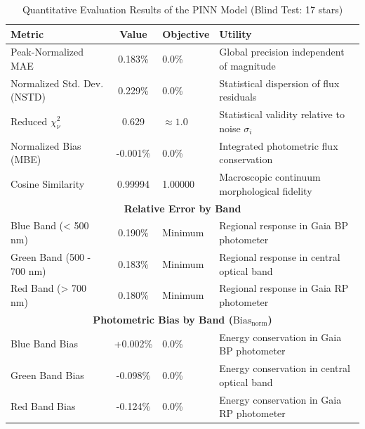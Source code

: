 
\begin{table}[htpb]
\centering
\caption{Quantitative Evaluation Results of the PINN Model (Blind Test: 17 stars)}
\label{tab:pinn_evaluation}
\begin{tabular}{lcll}
\hline
\textbf{Metric} & \textbf{Value} & \textbf{Objective} & \textbf{Utility} \\
\hline
Peak-Normalized MAE & 0.183\% & 0.0\% & Global precision independent of magnitude \\
Normalized Std. Dev. (NSTD) & 0.229\% & 0.0\% & Statistical dispersion of flux residuals \\
Reduced $\chi^2_\nu$ & 0.629 & $\approx 1.0$ & Statistical validity relative to noise $\sigma_i$ \\
Normalized Bias (MBE) & -0.001\% & 0.0\% & Integrated photometric flux conservation \\
Cosine Similarity & 0.99994 & 1.00000 & Macroscopic continuum morphological fidelity \\
\hline
\multicolumn{4}{c}{\textbf{Relative Error by Band}} \\
\hline
Blue Band (< 500 nm) & 0.190\% & Minimum & Regional response in Gaia BP photometer \\
Green Band (500 - 700 nm) & 0.183\% & Minimum & Regional response in central optical band \\
Red Band (> 700 nm) & 0.180\% & Minimum & Regional response in Gaia RP photometer \\
\hline
\multicolumn{4}{c}{\textbf{Photometric Bias by Band ($\text{Bias}_{\text{norm}}$)}} \\
\hline
Blue Band Bias & +0.002\% & 0.0\% & Energy conservation in Gaia BP photometer \\
Green Band Bias & -0.098\% & 0.0\% & Energy conservation in central optical band \\
Red Band Bias & -0.124\% & 0.0\% & Energy conservation in Gaia RP photometer \\
\hline
\end{tabular}
\end{table}
